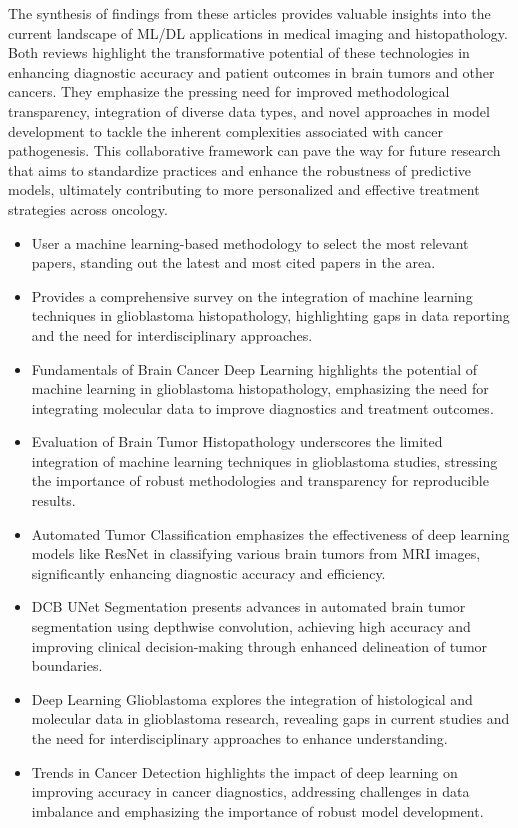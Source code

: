 \documentclass[runningheads]{llncs}
\begin{document}
The synthesis of findings from these articles provides valuable insights into the current landscape of ML/DL applications in medical imaging and histopathology. Both reviews highlight the transformative potential of these technologies in enhancing diagnostic accuracy and patient outcomes in brain tumors and other cancers. They emphasize the pressing need for improved methodological transparency, integration of diverse data types, and novel approaches in model development to tackle the inherent complexities associated with cancer pathogenesis. This collaborative framework can pave the way for future research that aims to standardize practices and enhance the robustness of predictive models, ultimately contributing to more personalized and effective treatment strategies across oncology.

\begin{itemize}[label=\textbullet]
    \item User a machine learning-based methodology to select the most relevant papers, standing out the latest and most cited papers in the area.
    \item Provides a comprehensive survey on the integration of machine learning techniques in glioblastoma histopathology, highlighting gaps in data reporting and the need for interdisciplinary approaches.
    \item Fundamentals of Brain Cancer Deep Learning highlights the potential of machine learning in glioblastoma histopathology, emphasizing the need for integrating molecular data to improve diagnostics and treatment outcomes.
    \item Evaluation of Brain Tumor Histopathology underscores the limited integration of machine learning techniques in glioblastoma studies, stressing the importance of robust methodologies and transparency for reproducible results.
    \item Automated Tumor Classification emphasizes the effectiveness of deep learning models like ResNet in classifying various brain tumors from MRI images, significantly enhancing diagnostic accuracy and efficiency.
    \item DCB UNet Segmentation presents advances in automated brain tumor segmentation using depthwise convolution, achieving high accuracy and improving clinical decision-making through enhanced delineation of tumor boundaries.
    \item Deep Learning Glioblastoma explores the integration of histological and molecular data in glioblastoma research, revealing gaps in current studies and the need for interdisciplinary approaches to enhance understanding.
    \item Trends in Cancer Detection highlights the impact of deep learning on improving accuracy in cancer diagnostics, addressing challenges in data imbalance and emphasizing the importance of robust model development.
\end{itemize}
\end{document}
